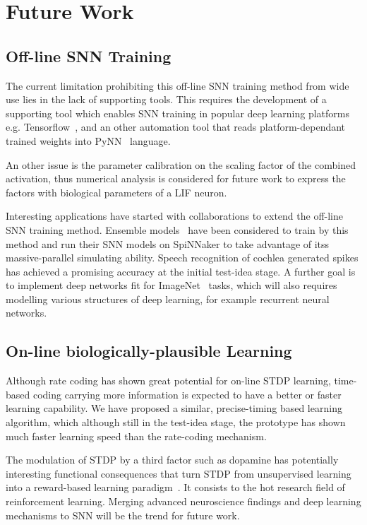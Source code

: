 \section{Future Work}
\subsection{Off-line SNN Training}
The current limitation prohibiting this off-line SNN training method from wide use lies in the lack of supporting tools.
This requires the development of a supporting tool which enables SNN training in popular deep learning platforms e.g. Tensorflow~\cite{tensorflow2015-whitepaper}, and an other automation tool that reads platform-dependant trained weights into PyNN~\cite{davison2008pynn} language.

An other issue is the parameter calibration on the scaling factor of the combined activation, thus numerical analysis is considered for future work to express the factors with biological parameters of a LIF neuron.

Interesting applications have started with collaborations to extend the off-line SNN training method.
Ensemble models~\cite{rokach2010ensemble} have been considered to train by this method and run their SNN models on SpiNNaker to take advantage of itss massive-parallel simulating ability.
Speech recognition of cochlea generated spikes has achieved a promising accuracy at the initial test-idea stage.
A further goal is to implement deep networks fit for ImageNet~\cite{deng2009imagenet} tasks, which will also requires modelling various structures of deep learning, for example recurrent neural networks.


\subsection{On-line biologically-plausible Learning}
Although rate coding has shown great potential for on-line STDP learning, time-based coding carrying more information is expected to have a better or faster learning capability.
We have proposed a similar, precise-timing based learning algorithm, which although still in the test-idea stage, the prototype has shown much faster learning speed than the rate-coding mechanism.

The modulation of STDP by a third factor such as dopamine has potentially interesting functional consequences that turn STDP from unsupervised learning into a reward-based learning paradigm~\cite{izhikevich2007solving}.
It consists to the hot research field of reinforcement learning.
Merging advanced neuroscience findings and deep learning mechanisms to SNN will be the trend for future work.



